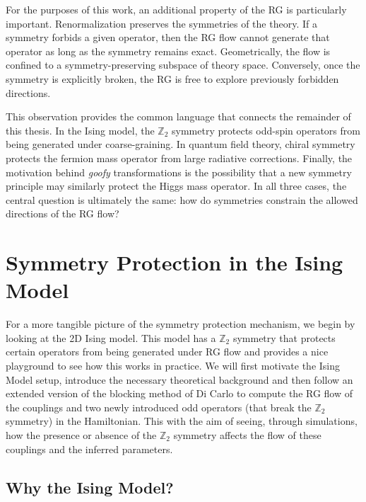 \documentclass[a4paper, 11pt]{article}
\begin{document}
For the purposes of this work, an additional property of the RG is particularly important. Renormalization preserves the symmetries of the theory. If a symmetry forbids a given operator, then the RG flow cannot generate that operator as long as the symmetry remains exact. Geometrically, the flow is confined to a symmetry-preserving subspace of theory space. Conversely, once the symmetry is explicitly broken, the RG is free to explore previously forbidden directions.

This observation provides the common language that connects the remainder of this thesis. In the Ising model, the $\mathbb{Z}_2$ symmetry protects odd-spin operators from being generated under coarse-graining. In quantum field theory, chiral symmetry protects the fermion mass operator from large radiative corrections. Finally, the motivation behind \textit{goofy} transformations is the possibility that a new symmetry principle may similarly protect the Higgs mass operator. In all three cases, the central question is ultimately the same: how do symmetries constrain the allowed directions of the RG flow?


\section{Symmetry Protection in the Ising Model} %
\label{sec:ising}

For a more tangible picture of the symmetry protection mechanism, we begin by looking at the 2D Ising model. This model has a $\mathbb{Z}_2$ symmetry that protects certain operators from being generated under RG flow and provides a nice playground to see how this works in practice. We will first motivate the Ising Model setup, introduce the necessary theoretical background and then follow an extended version of the blocking method of Di Carlo \cite{blocking} to compute the RG flow of the couplings and two newly introduced odd operators (that break the $\mathbb{Z}_2$ symmetry) in the Hamiltonian. This with the aim of seeing, through simulations, how the presence or absence of the $\mathbb{Z}_2$ symmetry affects the flow of these couplings and the inferred parameters.

\subsection{Why the Ising Model?}
\end{document}

